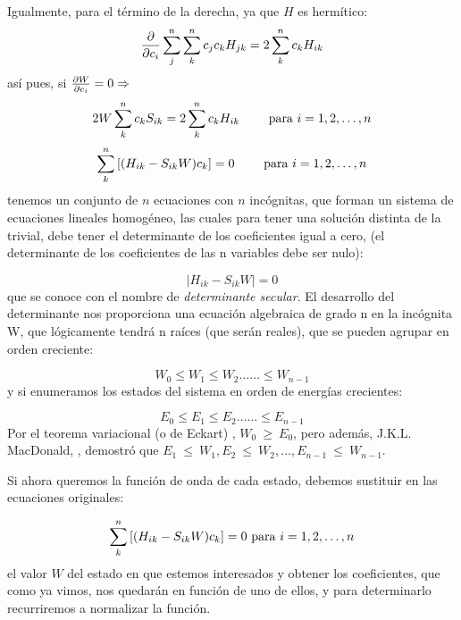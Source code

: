 \documentclass[a4paper,openright,12pt, oneside]{book}
\providecommand{\abs}[1]{\lvert#1\rvert}
\begin{document}
Igualmente, para el t\'ermino de la derecha, ya que $H$ es herm\'itico:
\begin{displaymath}{\partial \over \partial c_{i}} \sum^{n}_{j} \sum^{n}_{k} c_{j} c_{k}
H_{jk} = 2 \sum^{n}_{k} c_{k} H_{ik} \end{displaymath}
as\'i pues, si         ${\partial W\over \partial c_{i}} = 0 \Rightarrow$
\begin{displaymath}2 W \sum^{n}_{k} c_{k} S_{ik} = 2 \sum^{n}_{k} c_{k} H_{ik}\qquad \hbox{
para }i = 1,2,\ldots ,n \end{displaymath}
\begin{displaymath}\sum^{n}_{k} \left[(H_{ik} - S_{ik} W ) c_{k} \right] = 0 \qquad
\hbox{ para } i = 1,2,\ldots ,n \end{displaymath}
tenemos un conjunto de $n$ ecuaciones con $n$ inc\'ognitas, que forman un sistema de ecuaciones lineales homog\'eneo, las cuales para tener una soluci\'on distinta de la trivial, debe tener el determinante de los coeficientes igual a cero, (el determinante de los coeficientes de las n variables debe ser nulo):

\begin{displaymath} \abs{ H_{ik} - S_{ik} W} = 0 \end{displaymath}
que se conoce con el nombre de \emph{determinante secular}.
El desarrollo del determinante nos proporciona una ecuaci\'on algebraica de grado n en la inc\'ognita W, que l\'ogicamente tendr\'a n ra\'ices (que ser\'an reales), que se pueden agrupar en orden creciente:

\begin{displaymath}W_{0} \le W_{1} \le W_{2} \ldots \ldots \le W_{n-1} \end{displaymath}
y si enumeramos los estados del sistema en orden de energ\'ias crecientes:

\begin{displaymath}E_{0} \le E_{1} \le E_{2} \ldots \ldots \le E_{n-1} \end{displaymath}
Por el teorema variacional (o de Eckart) ,  $W_{0}~\ge ~E_{0}$, pero adem\'as, J.K.L. MacDonald, \cite{macdonald}, demostr\'o que  $E_{1}~\le ~W_{1}, E_{2}~\le ~W_{2},
\ldots , E_{n-1}~\le ~W_{n-1}$.

Si ahora queremos la funci\'on de onda de cada estado, debemos sustituir en las ecuaciones originales:

\begin{displaymath}
\sum^{n}_{k} \left[{(H_{ik} - S_{ik} W) c_{k}}\right] = 0\ \hbox{para}\ i = 1,2,\ldots ,n
\end{displaymath}
el valor $W$ del estado en que estemos interesados y obtener los coeficientes, que como ya vimos, nos quedar\'an en funci\'on de uno de ellos, y para determinarlo recurriremos a normalizar la funci\'on.
\end{document}
